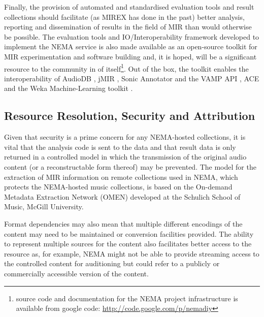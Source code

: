 \documentclass[conference]{IEEEtran}
\begin{document}
Finally, the provision of automated and standardised evaluation tools and result collections should facilitate (as MIREX has done in the past) better analysis, reporting and dissemination of results in the field of MIR than would otherwise be possible.
The evaluation tools and IO/Interoperability framework developed to implement the NEMA service is also made available as an open-source toolkit for MIR experimentation and software building and, it is hoped, will be a significant resource to the community in of itself\footnote{source code and documentation for the NEMA project infrastructure is available from google code: \url{http://code.google.com/p/nemadiy}}. 
Out of the box, the toolkit enables the interoperability of AudioDB \cite{casey2008audiodb}, jMIR \cite{mckay2009jmir}, Sonic Annotator and the VAMP API \cite{cannam2006sonic}, ACE \cite{mckay2005ace} and the Weka Machine-Learning toolkit \cite{witten1999wpm}.  


\subsection{Resource Resolution, Security and Attribution}
Given that security is a prime concern for any NEMA-hosted collections, it is vital that the analysis code is sent to the data and that result data is only returned in a controlled model in which the transmission of the original audio content (or a reconstructable form thereof) may be prevented.
The model for the extraction of MIR information on remote collections used in NEMA, which protects the NEMA-hosted music collections, is based on the On-demand Metadata Extraction Network (OMEN) \cite{mcennis2006overview} developed at the Schulich School of Music, McGill University.

Format dependencies may also mean that multiple different encodings of the content may need to be maintained or conversion facilities provided. The ability to represent multiple sources for the content also facilitates better access to the resource as, for example, NEMA might not be able to provide streaming access to the controlled content for auditioning but could refer to a publicly or commercially accessible version of the content. 
\end{document}
